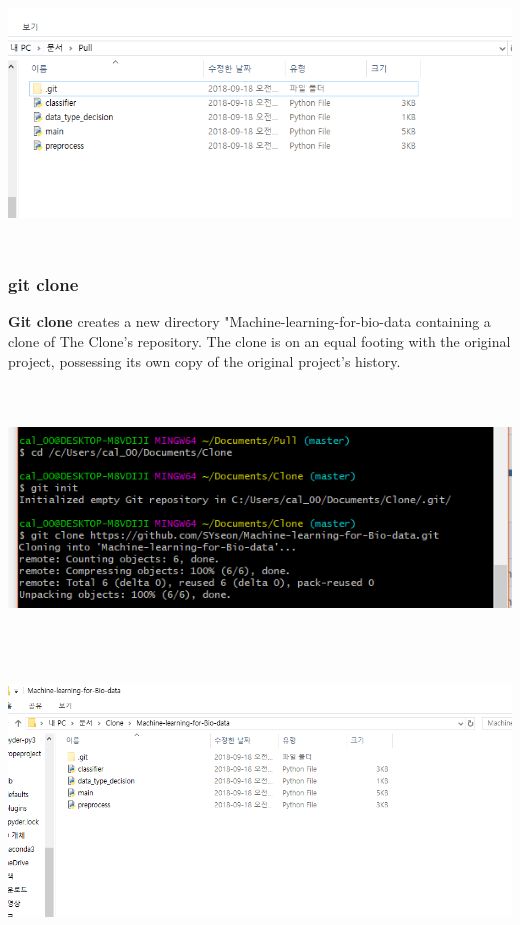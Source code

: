 \documentclass[11pt]{article}
\begin{document}
		\includegraphics[height=7cm, width=14cm]{gitpull03.PNG}

		\subsubsection{git clone}
		\textbf{Git clone} creates a new directory "Machine-learning-for-bio-data containing a clone of The Clone’s repository. The clone is on an equal footing with the original project, possessing its own copy of the original project’s history.
		
		\includegraphics[height=7cm, width=14cm]{gitclone01.PNG}
		
		\includegraphics[height=7cm, width=14cm]{gitclone02.PNG}
		\pagebreak
		
\end{document}
